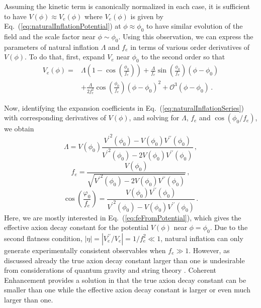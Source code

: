 \documentclass[12pt]{article}
\begin{document}
Assuming the kinetic term is canonically normalized in each case, it is sufficient to have $V\left(\phi\right) \approx V_{e}\left(\phi\right)$ where $V_{e}\left(\phi\right)$ is given by Eq.~(\ref{eq:naturalInflationPotential}) at $\phi \approx \phi_0$ to have similar evolution of the field and the scale factor near $\phi \sim \phi_0$.
Using this observation, we can express the parameters of natural inflation $\Lambda$ and $f_e$ in terms of various order derivatives of $V\left(\phi\right)$.
To do that, first, expand $V_{e}$ near $\phi_0$ to the second order so that
\begin{equation} \label{eq:naturalInflationSeries}
  \begin{aligned}
    V_{e}\left(\phi\right) =
      &\Lambda \left(1 - \cos\left(\frac{\phi_0}{f_e}\right)\right)
        + \frac{\Lambda}{f_e} \sin\left(\frac{\phi_0}{f_e}\right) \left(\phi - \phi_0\right)\\
      & + \frac{\Lambda}{2 f_e^2} \cos\left(\frac{\phi_0}{f_e}\right) \left(\phi - \phi_0\right)^2
        + \mathcal{O}^3\left(\phi - \phi_0\right)\,.
  \end{aligned}
\end{equation}

Now, identifying the expansion coefficients in Eq.~(\ref{eq:naturalInflationSeries}) with corresponding derivatives of $V\left(\phi\right)$, and solving for $\Lambda$, $f_e$ and $\cos\left(\phi_0 / f_e\right)$, we obtain
\begin{equation} \label{eq:lambdaFromPotential}
  \Lambda = V\left(\phi_0\right) \frac
    {{V^\prime}^2\left(\phi_0\right) - V\left(\phi_0\right) V^{\prime\prime}\left(\phi_0\right)}
    {{V^\prime}^2\left(\phi_0\right) - 2 V\left(\phi_0\right) V^{\prime\prime}\left(\phi_0\right)}
  \,,
\end{equation}
\begin{equation} \label{eq:feFromPotential}
  f_e = \frac
    {V\left(\phi_0\right)}
    {\sqrt{{V^\prime}^2\left(\phi_0\right)
      - 2 V\left(\phi_0\right) V^{\prime\prime}\left(\phi_0\right)}}\,,
\end{equation}
\begin{equation} \label{eq:fieldInitialFromPotential}
  \cos\left(\frac{\varphi_0}{f_e}\right) = \frac
    {V\left(\phi_0\right) V^{\prime\prime}\left(\phi_0\right)}
    {{V^\prime}^2\left(\phi_0\right) - V\left(\phi_0\right) V^{\prime\prime}\left(\phi_0\right)}\,.
\end{equation}
Here, we are mostly interested in Eq.~(\ref{eq:feFromPotential}), which gives the effective axion decay constant for the potential $V\left(\phi\right)$ near $\phi = \phi_0$.
Due to the second flatness condition, $\left|\eta\right| = \left|V_e^{\prime\prime} / V_e\right| = 1 / f_e^2 \ll 1$, natural inflation can only generate experimentally consistent observables when $f_e \gg 1$.
However, as discussed already the true axion decay constant larger than one is undesirable from considerations of quantum gravity and string theory \cite{Kallosh:1995hi, Banks:2003sx}.
Coherent Enhancement provides a solution in that the true axion decay constant can be smaller than one while the effective axion decay constant is larger or even much larger than one.
\end{document}
